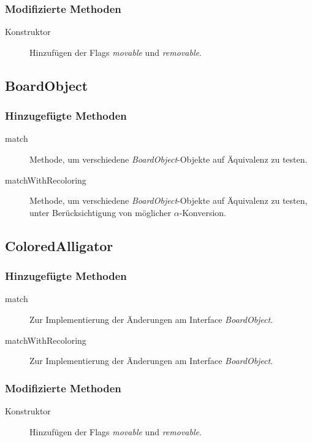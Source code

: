 \subsubsection{Modifizierte Methoden}
\begin{description}
\item[Konstruktor]
Hinzufügen der Flags \emph{movable} und \emph{removable}.
\end{description}


\subsection{BoardObject}

\subsubsection{Hinzugefügte Methoden}
\begin{description}
\item[match]
Methode, um verschiedene \emph{BoardObject}-Objekte auf Äquivalenz zu testen.
\item[matchWithRecoloring]
Methode, um verschiedene \emph{BoardObject}-Objekte auf Äquivalenz zu testen, unter Berücksichtigung von möglicher \(\alpha\)-Konversion.
\end{description}


\subsection{ColoredAlligator}

\subsubsection{Hinzugefügte Methoden}
\begin{description}
\item[match]
Zur Implementierung der Änderungen am Interface \emph{BoardObject}.
\item[matchWithRecoloring]
Zur Implementierung der Änderungen am Interface \emph{BoardObject}.
\end{description}

\subsubsection{Modifizierte Methoden}
\begin{description}
\item[Konstruktor]
Hinzufügen der Flags \emph{movable} und \emph{removable}.
\end{description}


